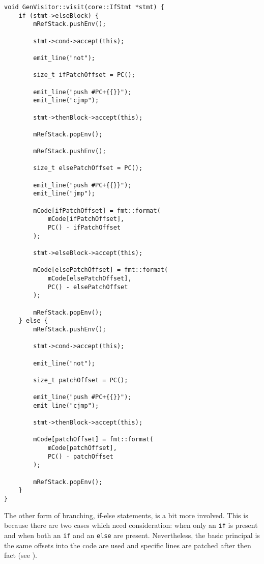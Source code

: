 \begin{lstlisting}[caption={The \texttt{visit(IfStmt *)}
method in the \texttt{GenVisitor} class
(ir\_gen/GenVisitor.cpp)}, label=lst:ifstmtgen]
void GenVisitor::visit(core::IfStmt *stmt) {
    if (stmt->elseBlock) {
        mRefStack.pushEnv();

        stmt->cond->accept(this);

        emit_line("not");

        size_t ifPatchOffset = PC();

        emit_line("push #PC+{{}}");
        emit_line("cjmp");

        stmt->thenBlock->accept(this);

        mRefStack.popEnv();

        mRefStack.pushEnv();

        size_t elsePatchOffset = PC();

        emit_line("push #PC+{{}}");
        emit_line("jmp");

        mCode[ifPatchOffset] = fmt::format(
            mCode[ifPatchOffset],
            PC() - ifPatchOffset
        );

        stmt->elseBlock->accept(this);

        mCode[elsePatchOffset] = fmt::format(
            mCode[elsePatchOffset],
            PC() - elsePatchOffset
        );

        mRefStack.popEnv();
    } else {
        mRefStack.pushEnv();

        stmt->cond->accept(this);

        emit_line("not");

        size_t patchOffset = PC();

        emit_line("push #PC+{{}}");
        emit_line("cjmp");

        stmt->thenBlock->accept(this);

        mCode[patchOffset] = fmt::format(
            mCode[patchOffset],
            PC() - patchOffset
        );

        mRefStack.popEnv();
    }
}
\end{lstlisting}

The other form of branching, if-else statements, is a bit more
involved. This is because there are two cases which need
consideration: when only an \texttt{if} is present and when both
an \texttt{if} and an \texttt{else} are present. Nevertheless,
the basic principal is the same offsets into the code are used
and specific lines are patched after then fact (see
).

